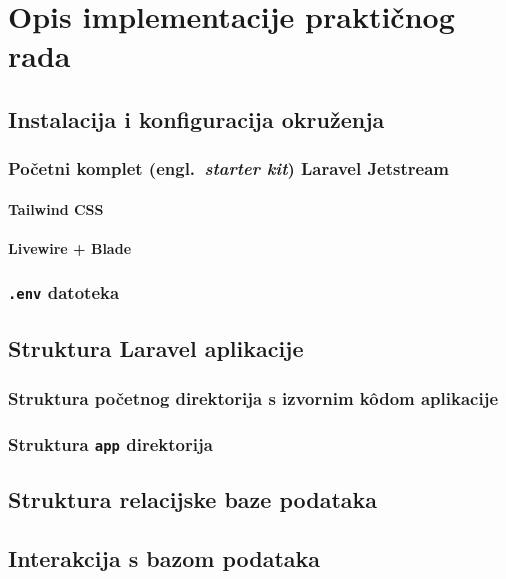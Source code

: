 \section{Opis implementacije praktičnog rada}

\subsection{Instalacija i konfiguracija okruženja}

\subsubsection{Početni komplet (engl.~\textit{starter kit}) Laravel Jetstream}

\paragraph{Tailwind CSS}

\paragraph{Livewire + Blade}

\subsubsection{\texttt{.env} datoteka}

\subsection{Struktura Laravel aplikacije}

\subsubsection{Struktura početnog direktorija s izvornim k\^odom aplikacije}

\subsubsection{Struktura \texttt{app} direktorija}

\subsection{Struktura relacijske baze podataka}

\subsection{Interakcija s bazom podataka}

